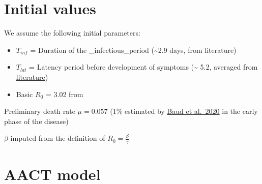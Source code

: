 \documentclass[]{article}
\begin{document}
\hypertarget{initial-values}{%
\section{Initial values}\label{initial-values}}

We assume the following initial parameters:

\begin{itemize}
\item
  \(T_{inf}\) = Duration of the \_infectious\_period (\textasciitilde2.9
  days, from literature)
\item
  \(T_{lat}\) = Latency period before development of symptoms
  (\textasciitilde{} 5.2, averaged from
  \href{https://www.eurosurveillance.org/content/10.2807/1560-7917.ES.2020.25.5.2000062}{literature})
\item
  Basic \(R_0\) = 3.02 from
  \href{https://doi.org/10.1016/S2214-109X\%2820\%2930113-3}{}
\end{itemize}

Preliminary death rate \(\mu = 0.057\) (1\% estimated by
\href{https://doi.org/10.1016/S1473-3099\%2820\%2930195-X}{Baud et
al.~2020} in the early phase of the disease)

\(\beta\) imputed from the definition of
\(\displaystyle R_{0}= \frac{\beta}{\gamma}\)

\newpage

\hypertarget{aact-model}{%
\section{AACT model}\label{aact-model}}
\end{document}
